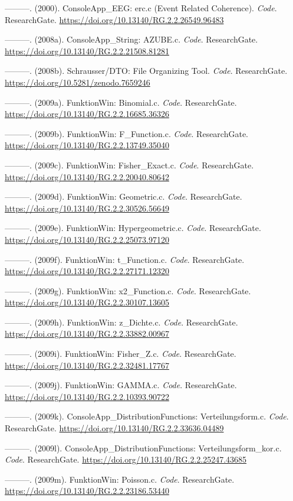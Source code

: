 \documentclass[
]{article}
\begin{document}
---------. (2000). ConsoleApp\_EEG: erc.c (Event Related Coherence).
\emph{Code}. ResearchGate.
\url{https://doi.org/10.13140/RG.2.2.26549.96483}

---------. (2008a). ConsoleApp\_String: AZUBE.c. \emph{Code}.
ResearchGate. \url{https://doi.org/10.13140/RG.2.2.21508.81281}

---------. (2008b). Schrausser/DTO: File Organizing Tool. \emph{Code}.
ResearchGate. \url{https://doi.org/10.5281/zenodo.7659246}

---------. (2009a). FunktionWin: Binomial.c. \emph{Code}. ResearchGate.
\url{https://doi.org/10.13140/RG.2.2.16685.36326}

---------. (2009b). FunktionWin: F\_Function.c. \emph{Code}.
ResearchGate. \url{https://doi.org/10.13140/RG.2.2.13749.35040}

---------. (2009c). FunktionWin: Fisher\_Exact.c. \emph{Code}.
ResearchGate. \url{https://doi.org/10.13140/RG.2.2.20040.80642}

---------. (2009d). FunktionWin: Geometric.c. \emph{Code}. ResearchGate.
\url{https://doi.org/10.13140/RG.2.2.30526.56649}

---------. (2009e). FunktionWin: Hypergeometric.c. \emph{Code}.
ResearchGate. \url{https://doi.org/10.13140/RG.2.2.25073.97120}

---------. (2009f). FunktionWin: t\_Function.c. \emph{Code}.
ResearchGate. \url{https://doi.org/10.13140/RG.2.2.27171.12320}

---------. (2009g). FunktionWin: x2\_Function.c. \emph{Code}.
ResearchGate. \url{https://doi.org/10.13140/RG.2.2.30107.13605}

---------. (2009h). FunktionWin: z\_Dichte.c. \emph{Code}. ResearchGate.
\url{https://doi.org/10.13140/RG.2.2.33882.00967}

---------. (2009i). FunktionWin: Fisher\_Z.c. \emph{Code}. ResearchGate.
\url{https://doi.org/10.13140/RG.2.2.32481.17767}

---------. (2009j). FunktionWin: GAMMA.c. \emph{Code}. ResearchGate.
\url{https://doi.org/10.13140/RG.2.2.10393.90722}

---------. (2009k). ConsoleApp\_DistributionFunctions:
Verteilungsform.c. \emph{Code}. ResearchGate.
\url{https://doi.org/10.13140/RG.2.2.33636.04489}

---------. (2009l). ConsoleApp\_DistributionFunctions:
Verteilungsform\_kor.c. \emph{Code}. ResearchGate.
\url{https://doi.org/10.13140/RG.2.2.25247.43685}

---------. (2009m). FunktionWin: Poisson.c. \emph{Code}. ResearchGate.
\url{https://doi.org/10.13140/RG.2.2.23186.53440}
\end{document}
